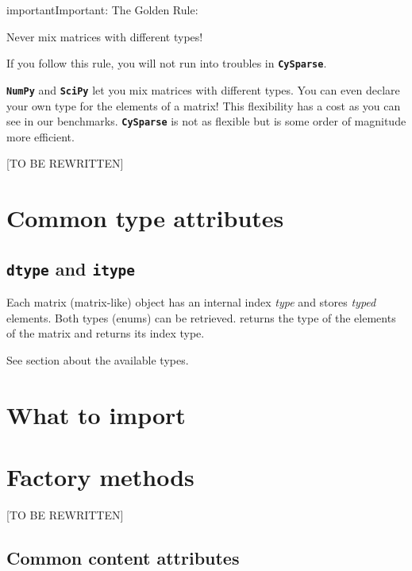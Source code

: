 \documentclass[letterpaper,10pt,english]{sphinxmanual}
\begin{document}
\begin{notice}{important}{Important:}
The Golden Rule:

Never mix matrices with different types!
\end{notice}

If you follow this rule, you will not run into troubles in \textbf{\texttt{CySparse}}.

\textbf{\texttt{NumPy}} and \textbf{\texttt{SciPy}} let you mix matrices with different types. You can even declare your own type for the elements of a matrix! This flexibility has a cost as you can see in our benchmarks. \textbf{\texttt{CySparse}}
is not as flexible but is some order of magnitude more efficient.

{[}TO BE REWRITTEN{]}


\section{Common type attributes}
\label{cysparse_basics:common-type-attributes}

\subsection{\texttt{dtype} and \texttt{itype}}
\label{cysparse_basics:dtype-and-itype}
Each matrix (matrix-like) object has an internal index \emph{type} and stores \emph{typed} elements. Both types (enums) can be retrieved.
 returns the type of the elements of the matrix and  returns its index type.

See section {\hyperref[types:availabe-types]{\emph{}}} about the available types.


\section{What to import}
\label{cysparse_basics:what-to-import}

\section{Factory methods}
\label{cysparse_basics:factory-methods}
{[}TO BE REWRITTEN{]}


\subsection{Common content attributes}
\label{cysparse_basics:common-content-attributes}
\end{document}
